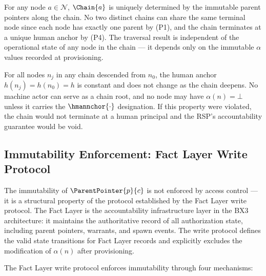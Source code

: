 \documentclass[12pt]{article}
\def\bxthree{BX3}
\begin{document}
\begin{cor}
\label{cor:chain-uniqueness}
For any node $a \in \mathcal{N}$, $\Chain{a}$ is uniquely determined by the immutable parent pointers along the chain. No two distinct chains can share the same terminal node since each node has exactly one parent by (P1), and the chain terminates at a unique human anchor by (P4). The traversal result is independent of the operational state of any node in the chain — it depends only on the immutable $\alpha$ values recorded at provisioning.
\end{cor}

\begin{cor}
\label{cor:non-collapsing-anchor}
For all nodes $n_j$ in any chain descended from $n_0$, the human anchor $h(n_j) = h(n_0) = h$ is constant and does not change as the chain deepens. No machine actor can serve as a chain root, and no node may have $\alpha(n) = \bot$ unless it carries the $\hmannchor{\cdot}$ designation. If this property were violated, the chain would not terminate at a human principal and the RSP's accountability guarantee would be void.
\end{cor}

\subsection{Immutability Enforcement: Fact Layer Write Protocol}
\label{sec:fact-layer-write-protocol}

The immutability of $\ParentPointer{p}{c}$ is not enforced by access control — it is a structural property of the protocol established by the Fact Layer write protocol. The Fact Layer is the accountability infrastructure layer in the \bxthree{} architecture: it maintains the authoritative record of all authorization state, including parent pointers, warrants, and spawn events. The write protocol defines the valid state transitions for Fact Layer records and explicitly excludes the modification of $\alpha(n)$ after provisioning.

The Fact Layer write protocol enforces immutability through four mechanisms:
\end{document}
